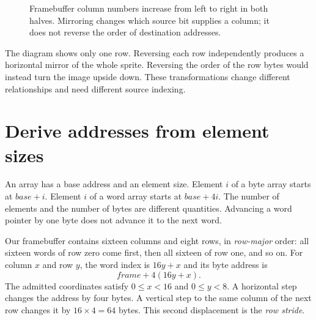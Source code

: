 \begin{figure}[htbp]
  \centering
  \caption{Framebuffer column numbers increase from left to right in both halves. Mirroring changes which source bit supplies a column; it does not reverse the order of destination addresses.}
  \label{fig:revision-sprite-row}
\end{figure}

The diagram shows only one row. Reversing each row independently produces a
horizontal mirror of the whole sprite. Reversing the order of the row bytes would
instead turn the image upside down. These transformations change different
relationships and need different source indexing.

\section{Derive addresses from element sizes}

An array has a base address and an element size. Element $i$ of a byte array starts
at $\textit{base}+i$. Element $i$ of a word array starts at
$\textit{base}+4i$. The number of elements and the number of bytes are different
quantities. Advancing a word pointer by one byte does not advance it to the next
word.

Our framebuffer contains sixteen columns and eight rows, in \emph{row-major}
order: all sixteen words of row zero come first, then all sixteen of row one,
and so on. For column $x$ and row $y$, the word index is $16y+x$ and its byte
address is
\[
  \textit{frame}+4(16y+x).
\]
The admitted coordinates satisfy $0\leq x<16$ and $0\leq y<8$. A horizontal
step changes the address by four bytes. A vertical step to the same column of
the next row changes it by $16\times4=64$ bytes. This second displacement is the
\emph{row stride}.

